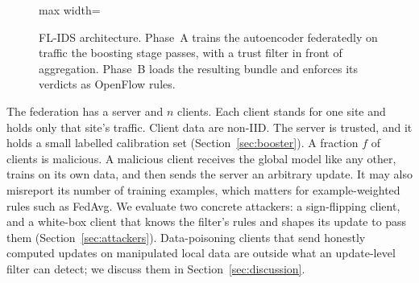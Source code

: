 \begin{figure}[t]
\begin{adjustbox}{max width=\textwidth}
\end{adjustbox}
\caption{FL-IDS architecture. Phase~A trains the autoencoder federatedly on traffic the boosting stage passes, with a trust filter in front of aggregation. Phase~B loads the resulting bundle and enforces its verdicts as OpenFlow rules.}
\label{fig:arch}
\end{figure}

The federation has a server and $n$ clients. Each client stands for one site and holds only that site's traffic. Client data are non-IID. The server is trusted, and it holds a small labelled calibration set (Section~\ref{sec:booster}). A fraction $f$ of clients is malicious. A malicious client receives the global model like any other, trains on its own data, and then sends the server an arbitrary update. It may also misreport its number of training examples, which matters for example-weighted rules such as FedAvg. We evaluate two concrete attackers: a sign-flipping client, and a white-box client that knows the filter's rules and shapes its update to pass them (Section~\ref{sec:attackers}). Data-poisoning clients that send honestly computed updates on manipulated local data are outside what an update-level filter can detect; we discuss them in Section~\ref{sec:discussion}.

